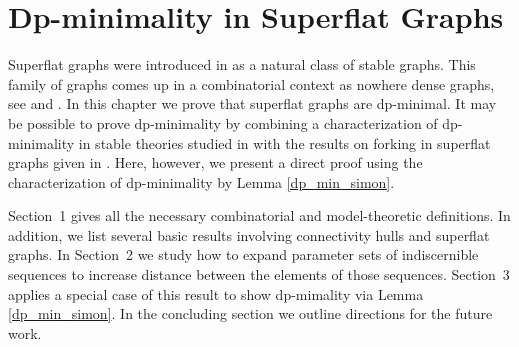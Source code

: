 \chapter{Dp-minimality in Superflat Graphs}
Superflat graphs were introduced in \cite{stable_graphs} as a natural class of stable graphs.
This family of graphs comes up in a combinatorial context as nowhere dense graphs, see \cite{adleradler} and \cite{nowhere}.
In this chapter we prove that superflat graphs are dp-minimal.
It may be possible to prove dp-minimality by combining a characterization of dp-minimality in stable theories studied in \cite{dpstable}
with the results on forking in superflat graphs given in \cite{ivanov}.
Here, however, we present a direct proof using the characterization of dp-minimality by Lemma \ref{dp_min_simon}.

Sec\-tion~1 gives all the necessary combinatorial and model-theoretic definitions.
In addition, we list several basic results involving connectivity hulls and superflat graphs.
In Sec\-tion~2 we study how to expand parameter sets of indiscernible sequences to increase distance between the elements of those sequences.
Sec\-tion~3 applies a special case of this result to show dp-mimality via Lemma \ref{dp_min_simon}.
In the concluding section we outline directions for the future work.


